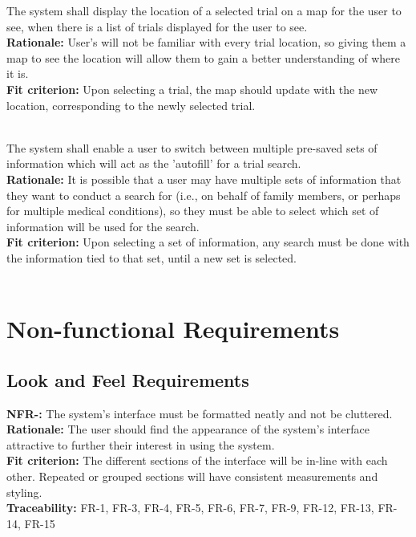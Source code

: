 \documentclass[12pt, titlepage]{article}
\newcounter{NFR_Counter}
\newcounter{FR_Counter}
\begin{document}
The system shall display the location of a selected trial on a map for the user to see, when there is a list of trials displayed for the user to see.\\
\textbf{Rationale:}
User's will not be familiar with every trial location, so giving them a map to see the location will allow them to gain a better understanding of where it is.\\
\textbf{Fit criterion:}
Upon selecting a trial, the map should update with the new location, corresponding to the newly selected trial.\\~\\
\addtocounter{FR_Counter}{1}


The system shall enable a user to switch between multiple pre-saved sets of information which will act as the 'autofill' for a trial search.\\
\textbf{Rationale:}
It is possible that a user may have multiple sets of information that they want to conduct a search for (i.e., on behalf of family members, or perhaps 
for multiple medical conditions), so they must be able to select which set of information will be used for the search.\\
\textbf{Fit criterion:}
Upon selecting a set of information, any search must be done with the information tied to that set, until a new set is selected.\\~\\
\addtocounter{FR_Counter}{1}

\section{Non-functional Requirements}

\subsection{Look and Feel Requirements}

\textbf{NFR-\the\value{NFR_Counter}:}
The system's interface must be formatted neatly and not be cluttered. \\
\textbf{Rationale:}
The user should find the appearance of the system's interface attractive to further their interest in using the system. \\
\textbf{Fit criterion:}
The different sections of the interface will be in-line with each other. Repeated or grouped sections will have consistent measurements and styling. \\
\textbf{Traceability:}
FR-1, FR-3, FR-4, FR-5, FR-6, FR-7, FR-9, FR-12, FR-13, FR-14, FR-15 \\~\\
\addtocounter{NFR_Counter}{1}
\end{document}
